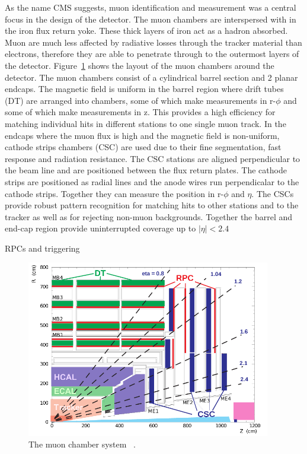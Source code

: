 As the name CMS suggests, muon identification and measurement was a central focus in the design of the detector. The muon chambers are interspersed with in the iron flux return yoke. These thick layers of iron act as a hadron absorbed. Muon are much less affected by radiative losses through the tracker material than electrons, therefore they are able to penetrate through to the outermost layers of the detector. Figure~\ref{fig:muonchamber} shows the layout of the muon chambers around the detector. The muon chambers consist of a cylindrical barrel section and 2 planar endcaps. The magnetic field is uniform in the barrel region where drift tubes (DT) are arranged into chambers, some of which make measurements in r-$\phi$ and some of which make measurements in z. This provides a high efficiency for matching individual hits in different stations to one single muon track.
In the endcaps where the muon flux is high and the magnetic field is non-uniform, cathode strips chambers (CSC) are used due to their fine segmentation, fast response and radiation resistance. The CSC stations are aligned perpendicular to the beam line and are positioned between the flux return plates. The cathode strips are positioned as radial lines and the anode wires run perpendicalar to the cathode strips. Together they can measure the position in r-$\phi$ and $\eta$. The CSCs provide robust pattern recognition for matching hits to other stations and to the tracker as well as for rejecting non-muon backgrounds. 
Together the barrel and end-cap region provide uninterrupted coverage up to $|\eta|<2.4$

RPCs and triggering
\begin{figure}[ht!]
\centering
    \includegraphics[width=0.95\textwidth]{images/MuonChambers.png}
    \caption{The muon chamber system ~\cite{Kim:2012ix}.}
    \label{fig:muonchamber}
\end{figure}

